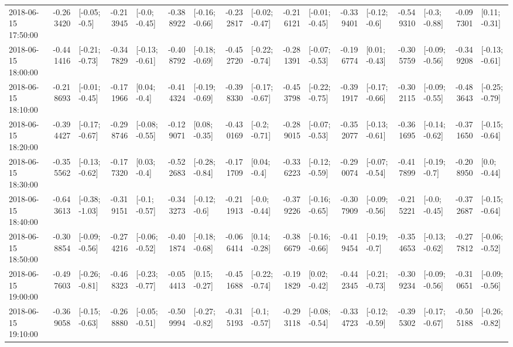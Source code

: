 \begin{tabular}{lrlrlrlrlrlrlrlrl}
2018-06-15 17:50:00 & -0.263420 &   [-0.05; -0.5] & -0.213945 &   [-0.0; -0.45] & -0.388922 &  [-0.16; -0.66] & -0.232817 &  [-0.02; -0.47] & -0.216121 &  [-0.01; -0.45] & -0.339401 &   [-0.12; -0.6] & -0.549310 &   [-0.3; -0.88] & -0.097301 &   [0.11; -0.31] \\
2018-06-15 18:00:00 & -0.441416 &  [-0.21; -0.73] & -0.347829 &  [-0.13; -0.61] & -0.408792 &  [-0.18; -0.69] & -0.452720 &  [-0.22; -0.74] & -0.281391 &  [-0.07; -0.53] & -0.196774 &   [0.01; -0.43] & -0.305759 &  [-0.09; -0.56] & -0.349208 &  [-0.13; -0.61] \\
2018-06-15 18:10:00 & -0.218693 &  [-0.01; -0.45] & -0.171966 &    [0.04; -0.4] & -0.414324 &  [-0.19; -0.69] & -0.398330 &  [-0.17; -0.67] & -0.453798 &  [-0.22; -0.75] & -0.391917 &  [-0.17; -0.66] & -0.302115 &  [-0.09; -0.55] & -0.483643 &  [-0.25; -0.79] \\
2018-06-15 18:20:00 & -0.394427 &  [-0.17; -0.67] & -0.298746 &  [-0.08; -0.55] & -0.129071 &   [0.08; -0.35] & -0.430169 &   [-0.2; -0.71] & -0.289015 &  [-0.07; -0.53] & -0.352077 &  [-0.13; -0.61] & -0.361695 &  [-0.14; -0.62] & -0.371650 &  [-0.15; -0.64] \\
2018-06-15 18:30:00 & -0.355562 &  [-0.13; -0.62] & -0.177320 &    [0.03; -0.4] & -0.522683 &  [-0.28; -0.84] & -0.171709 &    [0.04; -0.4] & -0.336223 &  [-0.12; -0.59] & -0.290074 &  [-0.07; -0.54] & -0.417899 &   [-0.19; -0.7] & -0.208950 &    [0.0; -0.44] \\
2018-06-15 18:40:00 & -0.643613 &  [-0.38; -1.03] & -0.319151 &   [-0.1; -0.57] & -0.343273 &   [-0.12; -0.6] & -0.211913 &   [-0.0; -0.44] & -0.379226 &  [-0.16; -0.65] & -0.307909 &  [-0.09; -0.56] & -0.215221 &   [-0.0; -0.45] & -0.372687 &  [-0.15; -0.64] \\
2018-06-15 18:50:00 & -0.308854 &  [-0.09; -0.56] & -0.274216 &  [-0.06; -0.52] & -0.401874 &  [-0.18; -0.68] & -0.066414 &   [0.14; -0.28] & -0.386679 &  [-0.16; -0.66] & -0.419454 &   [-0.19; -0.7] & -0.354653 &  [-0.13; -0.62] & -0.277812 &  [-0.06; -0.52] \\
2018-06-15 19:00:00 & -0.497603 &  [-0.26; -0.81] & -0.468323 &  [-0.23; -0.77] & -0.054413 &   [0.15; -0.27] & -0.451688 &  [-0.22; -0.74] & -0.191829 &   [0.02; -0.42] & -0.442345 &  [-0.21; -0.73] & -0.309234 &  [-0.09; -0.56] & -0.310651 &  [-0.09; -0.56] \\
2018-06-15 19:10:00 & -0.369058 &  [-0.15; -0.63] & -0.268880 &  [-0.05; -0.51] & -0.509994 &  [-0.27; -0.82] & -0.315193 &   [-0.1; -0.57] & -0.293118 &  [-0.08; -0.54] & -0.334723 &  [-0.12; -0.59] & -0.395302 &  [-0.17; -0.67] & -0.505188 &  [-0.26; -0.82] \\

\end{tabular}
